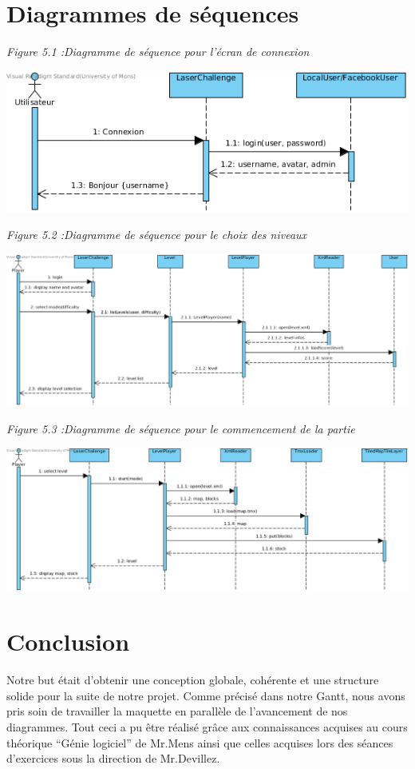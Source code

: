 \documentclass[a4paper,10pt]{article}
\begin{document}
\newpage

\section{Diagrammes de séquences}
\textit{Figure 5.1 :Diagramme de séquence pour l'écran de connexion}

\centerline{\includegraphics[scale=0.8]{../SequenceDiagram/Connexion.png}}

\textit{Figure 5.2 :Diagramme de séquence pour le choix des niveaux}

\centerline{\includegraphics[scale=0.6]{../SequenceDiagram/LevelSelection.png}}

\textit{Figure 5.3 :Diagramme de séquence pour le commencement de la partie}

\centerline{\includegraphics[scale=0.6]{../SequenceDiagram/LevelStart.png}}

\newpage

\section{Conclusion}
Notre but était d'obtenir une conception globale, cohérente et une structure solide pour la suite de notre projet. Comme précisé
dans notre Gantt, nous avons pris soin de travailler la maquette en parallèle de l'avancement de nos diagrammes. Tout ceci a pu être réalisé
grâce aux connaissances acquises au cours théorique ``Génie logiciel'' de Mr.Mens ainsi que celles acquises lors des séances d'exercices sous 
la direction de Mr.Devillez.
\end{document}
